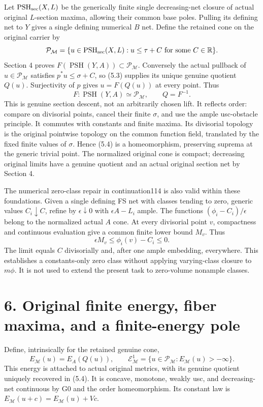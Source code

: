 \documentclass[
  10pt,
]{article}
\begin{document}
Let \(\operatorname{PSH}_{\rm sec}(X,L)\) be the generically finite
single decreasing-net closure of actual original \(L\)-section maxima,
allowing their common base poles. Pulling its defining net to \(Y\)
gives a single defining numerical \(B\) net. Define the retained cone on
the original carrier by \[\mathcal P_{\mathcal M}
=\{u\in\operatorname{PSH}_{\rm sec}(X,L):u\leq\tau+C\text{ for some }C\in\mathbb R\}.\]
Section 4 proves
\(F(\operatorname{PSH}(Y,A))\subset\mathcal P_{\mathcal M}\). Conversely
the actual pullback of \(u\in\mathcal P_{\mathcal M}\) satisfies
\(p^*u\leq\sigma+C\), so (5.3) supplies its unique genuine quotient
\(Q(u)\). Surjectivity of \(p\) gives \(u=F(Q(u))\) at every point. Thus
\[F:\operatorname{PSH}(Y,A)\simeq\mathcal P_{\mathcal M},\qquad Q=F^{-1}. \tag{5.4}\]
This is genuine section descent, not an arbitrarily chosen lift. It
reflects order: compare on divisorial points, cancel their finite
\(\sigma\), and use the ample usc-obstacle principle. It commutes with
constants and finite maxima. Its divisorial topology is the original
pointwise topology on the common function field, translated by the fixed
finite values of \(\sigma\). Hence (5.4) is a homeomorphism, preserving
suprema at the generic trivial point. The normalized original cone is
compact; decreasing original limits have a genuine quotient and an
actual original section net by Section 4.

The numerical zero-class repair in continuation114 is also valid within
these foundations. Given a single defining FS net with classes tending
to zero, generic values \(C_i\downarrow C\), refine by
\(\epsilon\downarrow0\) with \(\epsilon A-L_i\) ample. The functions
\((\phi_i-C_i)/\epsilon\) belong to the normalized actual \(A\) cone. At
every divisorial point \(v\), compactness and continuous evaluation give
a common finite lower bound \(M_v\). Thus
\[\epsilon M_v\leq\phi_i(v)-C_i\leq0.\] The limit equals \(C\)
divisorially and, after one ample embedding, everywhere. This
establishes a constants-only zero class without applying varying-class
closure to \(m\phi\). It is not used to extend the present task to
zero-volume nonample classes.

\section{6. Original finite energy, fiber maxima, and a finite-energy
pole}\label{original-finite-energy-fiber-maxima-and-a-finite-energy-pole}

Define, intrinsically for the retained genuine cone,
\[E_{\mathcal M}(u)=E_A(Q(u)),\qquad
\mathcal E^1_{\mathcal M}=\{u\in\mathcal P_{\mathcal M}:E_{\mathcal M}(u)>-\infty\}. \tag{6.1}\]
This energy is attached to actual original metrics, with its genuine
quotient uniquely recovered in (5.4). It is concave, monotone, weakly
usc, and decreasing-net continuous by G0 and the order homeomorphism.
Its constant law is \(E_{\mathcal M}(u+c)=E_{\mathcal M}(u)+Vc\).
\end{document}
